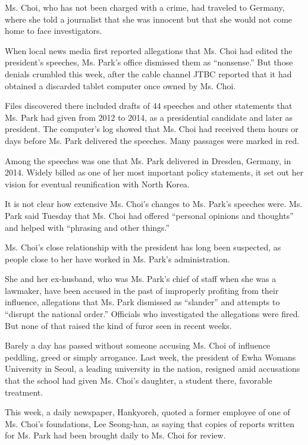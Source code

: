Ms. Choi, who has not been charged with a crime, had traveled to
Germany, where she told a journalist that she was innocent but that she
would not come home to face investigators.

When local news media first reported allegations that Ms. Choi had
edited the president's speeches, Ms. Park's office dismissed them as
``nonsense.'' But those denials crumbled this week, after the cable
channel JTBC reported that it had obtained a discarded tablet computer
once owned by Ms. Choi.

Files discovered there included drafts of 44 speeches and other
statements that Ms. Park had given from 2012 to 2014, as a presidential
candidate and later as president. The computer's log showed that Ms.
Choi had received them hours or days before Ms. Park delivered the
speeches. Many passages were marked in red.

Among the speeches was one that Ms. Park delivered in Dresden, Germany,
in 2014. Widely billed as one of her most important policy statements,
it set out her vision for eventual reunification with North Korea.

It is not clear how extensive Ms. Choi's changes to Ms. Park's speeches
were. Ms. Park said Tuesday that Ms. Choi had offered ``personal
opinions and thoughts'' and helped with ``phrasing and other things.''

Ms. Choi's close relationship with the president has long been
suspected, as people close to her have worked in Ms. Park's
administration.

She and her ex-husband, who was Ms. Park's chief of staff when she was a
lawmaker, have been accused in the past of improperly profiting from
their influence, allegations that Ms. Park dismissed as ``slander'' and
attempts to ``disrupt the national order.'' Officials who investigated
the allegations were fired. But none of that raised the kind of furor
seen in recent weeks.

Barely a day has passed without someone accusing Ms. Choi of influence
peddling, greed or simply arrogance. Last week, the president of Ewha
Womans University in Seoul, a leading university in the nation, resigned
amid accusations that the school had given Ms. Choi's daughter, a
student there, favorable treatment.

This week, a daily newspaper, Hankyoreh, quoted a former employee of one
of Ms. Choi's foundations, Lee Seong-han, as saying that copies of
reports written for Ms. Park had been brought daily to Ms. Choi for
review.

